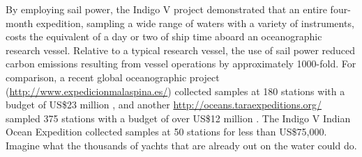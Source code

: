 By employing sail power, the Indigo V project demonstrated that an entire four-month expedition, sampling a wide range of waters with a variety of instruments, costs the equivalent of a day or two of ship time aboard an oceanographic research vessel. Relative to a typical research vessel, the use of sail power reduced carbon emissions resulting from vessel operations by approximately 1000-fold. For comparison, a recent global oceanographic project (\url{http://www.expedicionmalaspina.es/}) collected samples at 180 stations with a budget of US\$23 million \cite{malaspina, upv-ehu}, and another \url{http://oceans.taraexpeditions.org/} sampled 375 stations with a budget of over US\$12 million \cite{tara-embl, tara-2009, tara-2010, tara-2011}. The Indigo V Indian Ocean Expedition collected samples at 50 stations for less than US\$75,000. Imagine what the thousands of yachts that are already out on the water could do.
